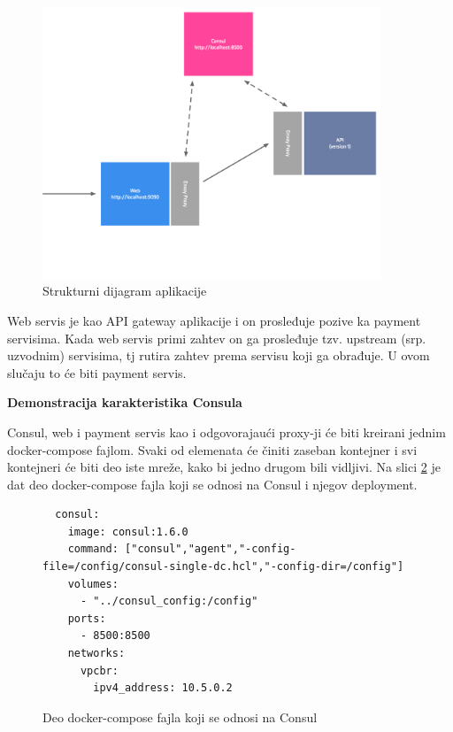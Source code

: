 \documentclass[a4paper,12pt]{report}
\begin{document}
\begin{figure}[h]
    \centering
    \includegraphics[width=0.9\textwidth]{app_structure_diagram_start}
    \caption{Strukturni dijagram aplikacije}
    \label{fig:structure-diagram}
\end{figure} 

Web servis je kao API gateway aplikacije i on prosleđuje pozive ka payment servisima.  Kada web servis primi zahtev on ga prosleđuje tzv. upstream (srp. uzvodnim) servisima, tj rutira zahtev prema servisu koji ga obrađuje. U ovom slučaju to će biti payment servis. \newline

\textbf{Demonstracija karakteristika Consula}\newline

Consul, web i payment servis kao i odgovorajaući proxy-ji će biti kreirani jednim docker-compose fajlom. Svaki od elemenata će činiti zaseban kontejner i svi kontejneri će biti deo iste mreže, kako bi jedno drugom bili vidljivi. Na slici \ref{dc-consul} je dat deo docker-compose fajla koji se odnosi na Consul i njegov deployment. \newline

\begin{figure}

\begin{verbatim}
  consul:
    image: consul:1.6.0
    command: ["consul","agent","-config-file=/config/consul-single-dc.hcl","-config-dir=/config"]
    volumes:
      - "../consul_config:/config"
    ports:
      - 8500:8500
    networks:
      vpcbr:
        ipv4_address: 10.5.0.2
\end{verbatim}
    \caption{Deo docker-compose fajla koji se odnosi na Consul}
    \label{dc-consul}
\end{figure} 
\end{document}
